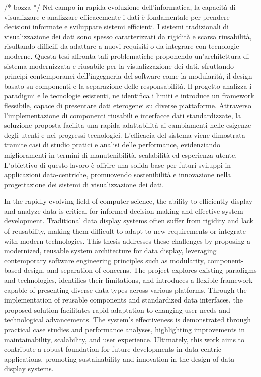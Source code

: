 
\cleardoublepage
\null
\begin{center}
\bfseries
\abstractname
\end{center}
/* bozza */
Nel campo in rapida evoluzione dell'informatica, la capacità di visualizzare e analizzare efficacemente i dati è fondamentale per prendere decisioni informate e sviluppare sistemi efficienti. I sistemi tradizionali di visualizzazione dei dati sono spesso caratterizzati da rigidità e scarsa riusabilità, risultando difficili da adattare a nuovi requisiti o da integrare con tecnologie moderne. Questa tesi affronta tali problematiche proponendo un'architettura di sistema modernizzata e riusabile per la visualizzazione dei dati, sfruttando principi contemporanei dell'ingegneria del software come la modularità, il design basato su componenti e la separazione delle responsabilità. Il progetto analizza i paradigmi e le tecnologie esistenti, ne identifica i limiti e introduce un framework flessibile, capace di presentare dati eterogenei su diverse piattaforme. Attraverso l'implementazione di componenti riusabili e interfacce dati standardizzate, la soluzione proposta facilita una rapida adattabilità ai cambiamenti nelle esigenze degli utenti e nei progressi tecnologici. L'efficacia del sistema viene dimostrata tramite casi di studio pratici e analisi delle performance, evidenziando miglioramenti in termini di manutenibilità, scalabilità ed esperienza utente. L'obiettivo di questo lavoro è offrire una solida base per futuri sviluppi in applicazioni data-centriche, promuovendo sostenibilità e innovazione nella progettazione dei sistemi di visualizzazione dei dati.
\vfill

\cleardoublepage
\null
\begin{center}
\bfseries
\abstractname
\end{center}
In the rapidly evolving field of computer science, the ability to efficiently display and analyze data is critical for informed decision-making and effective system development. Traditional data display systems often suffer from rigidity and lack of reusability, making them difficult to adapt to new requirements or integrate with modern technologies. This thesis addresses these challenges by proposing a modernized, reusable system architecture for data display, leveraging contemporary software engineering principles such as modularity, component-based design, and separation of concerns. The project explores existing paradigms and technologies, identifies their limitations, and introduces a flexible framework capable of presenting diverse data types across various platforms. Through the implementation of reusable components and standardized data interfaces, the proposed solution facilitates rapid adaptation to changing user needs and technological advancements. The system’s effectiveness is demonstrated through practical case studies and performance analyses, highlighting improvements in maintainability, scalability, and user experience. Ultimately, this work aims to contribute a robust foundation for future developments in data-centric applications, promoting sustainability and innovation in the design of data display systems.
\vfill
